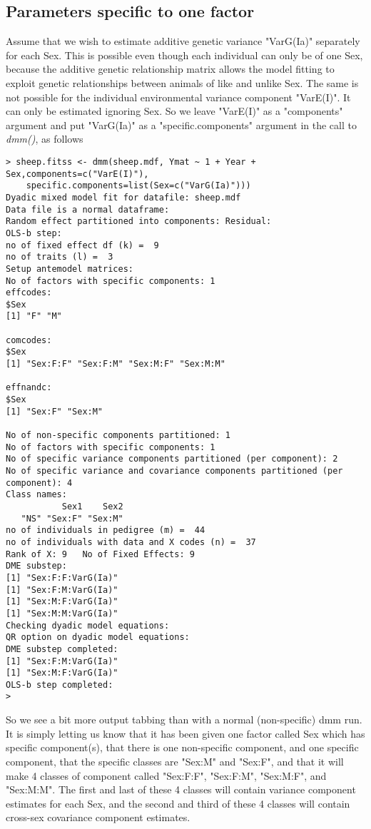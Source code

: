 \documentclass[titlepage]{article}  %
\begin{document}
\subsection{Parameters specific to one factor}

 Assume that we  wish to estimate additive genetic variance "VarG(Ia)" separately for each Sex. This is possible even though each individual can only be of one Sex, because the additive genetic relationship matrix  allows the model fitting to exploit genetic relationships between animals of like and unlike Sex. 
The same is not possible for the individual environmental variance component "VarE(I)". It can only be estimated ignoring Sex. So we leave "VarE(I)" as a "components" argument and put "VarG(Ia)" as a "specific.components" argument in the call to {\em dmm()}, as follows

\begin{verbatim}
> sheep.fitss <- dmm(sheep.mdf, Ymat ~ 1 + Year + Sex,components=c("VarE(I)"),
    specific.components=list(Sex=c("VarG(Ia)")))
Dyadic mixed model fit for datafile: sheep.mdf  
Data file is a normal dataframe:
Random effect partitioned into components: Residual:
OLS-b step:
no of fixed effect df (k) =  9 
no of traits (l) =  3 
Setup antemodel matrices:
No of factors with specific components: 1 
effcodes:
$Sex
[1] "F" "M"

comcodes:
$Sex
[1] "Sex:F:F" "Sex:F:M" "Sex:M:F" "Sex:M:M"

effnandc:
$Sex
[1] "Sex:F" "Sex:M"

No of non-specific components partitioned: 1 
No of factors with specific components: 1 
No of specific variance components partitioned (per component): 2 
No of specific variance and covariance components partitioned (per component): 4 
Class names:
           Sex1    Sex2 
   "NS" "Sex:F" "Sex:M" 
no of individuals in pedigree (m) =  44 
no of individuals with data and X codes (n) =  37 
Rank of X: 9   No of Fixed Effects: 9 
DME substep:
[1] "Sex:F:F:VarG(Ia)"
[1] "Sex:F:M:VarG(Ia)"
[1] "Sex:M:F:VarG(Ia)"
[1] "Sex:M:M:VarG(Ia)"
Checking dyadic model equations:
QR option on dyadic model equations:
DME substep completed:
[1] "Sex:F:M:VarG(Ia)"
[1] "Sex:M:F:VarG(Ia)"
OLS-b step completed:
> 
\end{verbatim}
So we see a bit more output tabbing than with a normal (non-specific) dmm run. It is simply letting us know that it has been given one factor called Sex which has specific component(s), that there is one non-specific component, and one specific component, that the specific classes are "Sex:M" and "Sex:F", and that it will make 4 classes of component called "Sex:F:F", "Sex:F:M", "Sex:M:F", and  "Sex:M:M". The first and last of these 4 classes will contain variance component  estimates for each Sex, and the second and third of these 4 classes will contain cross-sex covariance component estimates.
\end{document}
